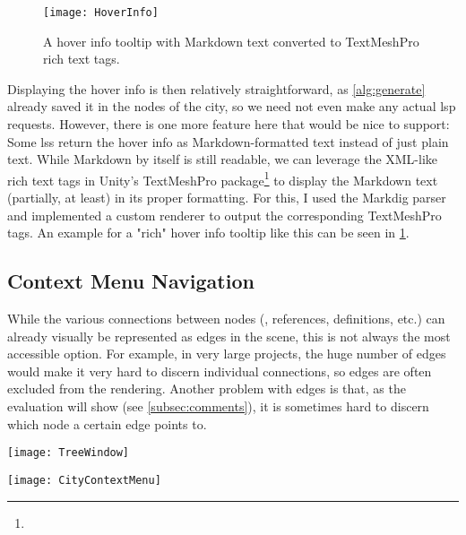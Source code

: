 \documentclass[../thesis]{subfiles}
\begin{document}
\begin{figure}
	\begin{center}
		\texttt{[image: HoverInfo]}
	\end{center}
	\caption{A hover info tooltip with Markdown text converted to TextMeshPro rich text tags.}\label{fig:hoverinfo}
\end{figure}

Displaying the hover info is then relatively straightforward, as \cref{alg:generate} already saved it in the nodes of the city, so we need not even make any actual \gls{lsp} requests.
However, there is one more feature here that would be nice to support:
Some \glspl{ls} return the hover info as Markdown-formatted text instead of just plain text.
While Markdown by itself is still readable, we can leverage the XML-like rich text tags in Unity's TextMeshPro package\footnote{
} to display the Markdown text (partially, at least) in its proper formatting.
For this, I used the Markdig parser~\cite{mutel2024} and implemented a custom renderer to output the corresponding TextMeshPro tags.
An example for a "rich" hover info tooltip like this can be seen in \cref{fig:hoverinfo}.

\subsection{Context Menu Navigation}\label{subsec:citycontext}
While the various connections between nodes (\ie{}, references, definitions, etc.) can already visually be represented as edges in the scene, this is not always the most accessible option.
For example, in very large projects, the huge number of edges would make it very hard to discern individual connections, so edges are often excluded from the rendering.
Another problem with edges is that, as the evaluation will show (see \cref{subsec:comments}), it is sometimes hard to discern which node a certain edge points to.

\begin{minipage}[t]{.75\textwidth}
	\centering
	\texttt{[image: TreeWindow]}
	\label{fig:treeview}
\end{minipage}%
\begin{minipage}[t]{.25\textwidth}
	\captionsetup{format=plain}
	\centering
	\texttt{[image: CityContextMenu]}
	\label{fig:contextcity}
\end{minipage}
\end{document}
